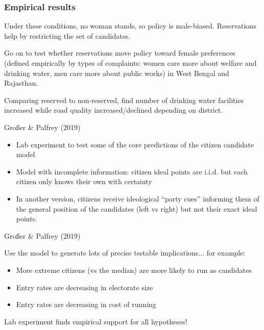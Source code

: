 \documentclass[11pt,aspectratio=169]{beamer}
\begin{document}
\begin{frame}
\frametitle{Empirical results}

Under these conditions, no woman stands, so policy is male-biased. Reservations help by restricting the set of candidates.

\bigskip

Go on to test whether reservations move policy toward female preferences (defined empirically by types of complaints: women care more about welfare and drinking water, men care more about public works) in West Bengal and Rajasthan. 

\bigskip

Comparing reserved to non-reserved, find number of drinking water facilities increased while road quality increased/declined depending on district. 

\end{frame}

\begin{frame}{Gro{\ss}er \& Palfrey (2019)}

\begin{itemize}
\item Lab experiment to test some of the core predictions of the citizen candidate model
\item Model with \alert{incomplete information}: citizen ideal points are i.i.d. but each citizen only knows their own with certainty
\item In another version, citizens receive ideological ``party cues'' informing them of the general position of the candidates (left vs right) but not their exact ideal points.
\end{itemize}

\end{frame}

\begin{frame}{Gro{\ss}er \& Palfrey (2019)}

Use the model to generate lots of precise testable implications... for example: 

\begin{itemize}
\item More extreme citizens (vs the median) are more likely to run as candidates
\item Entry rates are decreasing in electorate size
\item Entry rates are decreasing in cost of running
\end{itemize}

Lab experiment finds empirical support for all hypotheses! 

\end{frame}
\end{document}
